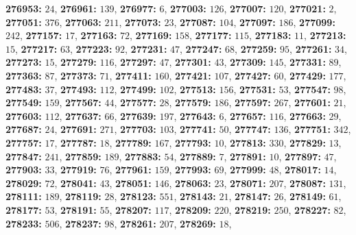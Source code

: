 \textsf{\bfseries 276953:} $24$, \textsf{\bfseries 276961:} $139$, \textsf{\bfseries 276977:} $6$, \textsf{\bfseries 277003:} $126$, \textsf{\bfseries 277007:} $120$, \textsf{\bfseries 277021:} $2$, \textsf{\bfseries 277051:} $376$, \textsf{\bfseries 277063:} $211$, \textsf{\bfseries 277073:} $23$, \textsf{\bfseries 277087:} $104$, \textsf{\bfseries 277097:} $186$, \textsf{\bfseries 277099:} $242$, \textsf{\bfseries 277157:} $17$, \textsf{\bfseries 277163:} $72$, \textsf{\bfseries 277169:} $158$, \textsf{\bfseries 277177:} $115$, \textsf{\bfseries 277183:} $11$, \textsf{\bfseries 277213:} $15$, \textsf{\bfseries 277217:} $63$, \textsf{\bfseries 277223:} $92$, \textsf{\bfseries 277231:} $47$, \textsf{\bfseries 277247:} $68$, \textsf{\bfseries 277259:} $95$, \textsf{\bfseries 277261:} $34$, \textsf{\bfseries 277273:} $15$, \textsf{\bfseries 277279:} $116$, \textsf{\bfseries 277297:} $47$, \textsf{\bfseries 277301:} $43$, \textsf{\bfseries 277309:} $145$, \textsf{\bfseries 277331:} $89$, \textsf{\bfseries 277363:} $87$, \textsf{\bfseries 277373:} $71$, \textsf{\bfseries 277411:} $160$, \textsf{\bfseries 277421:} $107$, \textsf{\bfseries 277427:} $60$, \textsf{\bfseries 277429:} $177$, \textsf{\bfseries 277483:} $37$, \textsf{\bfseries 277493:} $112$, \textsf{\bfseries 277499:} $102$, \textsf{\bfseries 277513:} $156$, \textsf{\bfseries 277531:} $53$, \textsf{\bfseries 277547:} $98$, \textsf{\bfseries 277549:} $159$, \textsf{\bfseries 277567:} $44$, \textsf{\bfseries 277577:} $28$, \textsf{\bfseries 277579:} $186$, \textsf{\bfseries 277597:} $267$, \textsf{\bfseries 277601:} $21$, \textsf{\bfseries 277603:} $112$, \textsf{\bfseries 277637:} $66$, \textsf{\bfseries 277639:} $197$, \textsf{\bfseries 277643:} $6$, \textsf{\bfseries 277657:} $116$, \textsf{\bfseries 277663:} $29$, \textsf{\bfseries 277687:} $24$, \textsf{\bfseries 277691:} $271$, \textsf{\bfseries 277703:} $103$, \textsf{\bfseries 277741:} $50$, \textsf{\bfseries 277747:} $136$, \textsf{\bfseries 277751:} $342$, \textsf{\bfseries 277757:} $17$, \textsf{\bfseries 277787:} $18$, \textsf{\bfseries 277789:} $167$, \textsf{\bfseries 277793:} $10$, \textsf{\bfseries 277813:} $330$, \textsf{\bfseries 277829:} $13$, \textsf{\bfseries 277847:} $241$, \textsf{\bfseries 277859:} $189$, \textsf{\bfseries 277883:} $54$, \textsf{\bfseries 277889:} $7$, \textsf{\bfseries 277891:} $10$, \textsf{\bfseries 277897:} $47$, \textsf{\bfseries 277903:} $33$, \textsf{\bfseries 277919:} $76$, \textsf{\bfseries 277961:} $159$, \textsf{\bfseries 277993:} $69$, \textsf{\bfseries 277999:} $48$, \textsf{\bfseries 278017:} $14$, \textsf{\bfseries 278029:} $72$, \textsf{\bfseries 278041:} $43$, \textsf{\bfseries 278051:} $146$, \textsf{\bfseries 278063:} $23$, \textsf{\bfseries 278071:} $207$, \textsf{\bfseries 278087:} $131$, \textsf{\bfseries 278111:} $189$, \textsf{\bfseries 278119:} $28$, \textsf{\bfseries 278123:} $551$, \textsf{\bfseries 278143:} $21$, \textsf{\bfseries 278147:} $26$, \textsf{\bfseries 278149:} $61$, \textsf{\bfseries 278177:} $53$, \textsf{\bfseries 278191:} $55$, \textsf{\bfseries 278207:} $117$, \textsf{\bfseries 278209:} $220$, \textsf{\bfseries 278219:} $250$, \textsf{\bfseries 278227:} $82$, \textsf{\bfseries 278233:} $506$, \textsf{\bfseries 278237:} $98$, \textsf{\bfseries 278261:} $207$, \textsf{\bfseries 278269:} $18$, 
